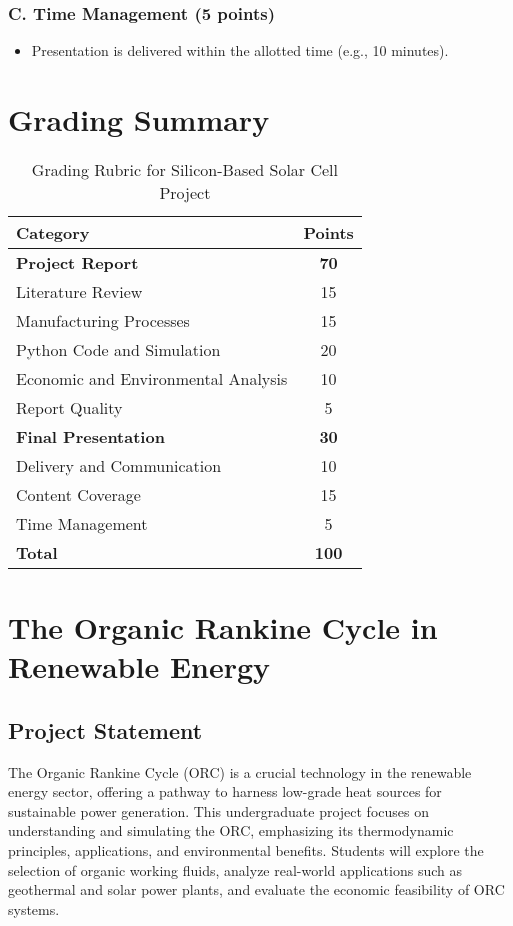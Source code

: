 \documentclass[11pt]{article}
\begin{document}
\subsubsection*{C. Time Management (5 points)}
\begin{itemize}
    \item Presentation is delivered within the allotted time (e.g., 10 minutes).
\end{itemize}

\section*{Grading Summary}
\begin{table}[h!]
    \centering
    \begin{tabular}{|l|c|}
        \hline
        \textbf{Category} & \textbf{Points} \\
        \hline
        \textbf{Project Report} & \textbf{70} \\
        Literature Review & 15 \\
        Manufacturing Processes & 15 \\
        Python Code and Simulation & 20 \\
        Economic and Environmental Analysis & 10 \\
        Report Quality & 5 \\
        \hline
        \textbf{Final Presentation} & \textbf{30} \\
        Delivery and Communication & 10 \\
        Content Coverage & 15 \\
        Time Management & 5 \\
        \hline
        \textbf{Total} & \textbf{100} \\
        \hline
    \end{tabular}
    \caption{Grading Rubric for Silicon-Based Solar Cell Project}
\end{table}



\newpage
\section{The Organic Rankine Cycle in Renewable Energy}

\subsection{Project Statement}
The Organic Rankine Cycle (ORC) is a crucial technology in the renewable energy sector, offering a pathway to harness low-grade heat sources for sustainable power generation. This undergraduate project focuses on understanding and simulating the ORC, emphasizing its thermodynamic principles, applications, and environmental benefits. Students will explore the selection of organic working fluids, analyze real-world applications such as geothermal and solar power plants, and evaluate the economic feasibility of ORC systems. 
\end{document}
